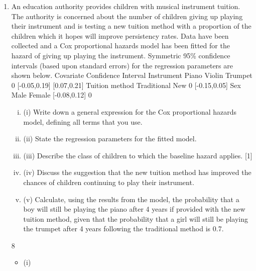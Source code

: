 \documentclass[a4paper,12pt]{article}
\begin{document}
\begin{enumerate}
\item %
An education authority provides children with musical instrument tuition. The
authority is concerned about the number of children giving up playing their
instrument and is testing a new tuition method with a proportion of the children which
it hopes will improve persistency rates. Data have been collected and a Cox
proportional hazards model has been fitted for the hazard of giving up playing the
instrument. Symmetric 95\% confidence intervals (based upon standard errors) for the
regression parameters are shown below.
Covariate
Confidence Interval
Instrument
Piano
Violin
Trumpet 0
[-0.05,0.19]
[0.07,0.21]
Tuition method
Traditional
New 0
[-0.15,0.05]
Sex
Male
Female
[-0.08,0.12]
0

\begin{enumerate}[(i)]
\item (i) Write down a general expression for the Cox proportional hazards model,
defining all terms that you use.

\item (ii) State the regression parameters for the fitted model. 
\item (iii) Describe the class of children to which the baseline hazard applies. [1]
\item (iv) Discuss the suggestion that the new tuition method has improved the chances
of children continuing to play their instrument.
\item 
(v) Calculate, using the results from the model, the probability that a boy will still
be playing the piano after 4 years if provided with the new tuition method,
given that the probability that a girl will still be playing the trumpet after 4
years following the traditional method is 0.7.

\end{enumerate}

\newpage

8
\begin{itemize}
\item (i)


\end{itemize}
\end{enumerate}
\end{document}
